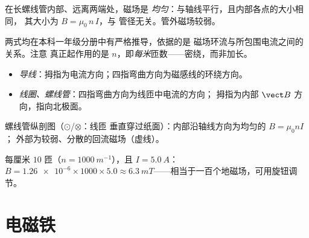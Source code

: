 \begin{proposition}[螺线管内部的磁场]\label{prop:g11:magnetic-fields:solenoidfield}
在长螺线管内部、远离两端处，磁场是
\emph{均匀}：与轴线平行，且内部各点的大小相同，
其大小为 $B = \mu_0\, n\, I$，与
管径无关。管外磁场较弱。
\end{proposition}
\admitted

\begin{remark}
两式均在本科一年级分册中有严格推导，依据的是
磁场环流与所包围电流之间的关系。注意
真正起作用的是 $n$，即\emph{每米}匝数——密绕，而非加长。
\end{remark}

\begin{method}[右手定则两用]\label{met:g11:magnetic-fields:righthand}
\begin{itemize}
  \item \emph{导线}：拇指为电流方向；四指弯曲方向为磁感线的环绕方向。
  \item \emph{线圈、螺线管}：四指弯曲方向为线匝中电流的方向；
        拇指为内部 $\vect B$ 方向，指向北极面。
\end{itemize}
\end{method}

\begin{omfigure}

{\small 螺线管纵剖图（$\odot$/$\otimes$：线匝
垂直穿过纸面）：内部沿轴线方向为均匀的 $B = \mu_0 n I$；
外部为较弱、分散的回流磁场（虚线）。}
\end{omfigure}

\begin{example}[螺线管的数值]\label{ex:g11:magnetic-fields:solenoid}
每厘米 $10$ 匝（$n = \qty{1000}{m^{-1}}$），且
$I = \qty{5.0}{A}$：$B = \num{1.26e-6} \times 1000 \times 5.0 \approx
\qty{6.3}{mT}$——相当于一百个地磁场，可用旋钮调节。
\end{example}

\section{电磁铁}

